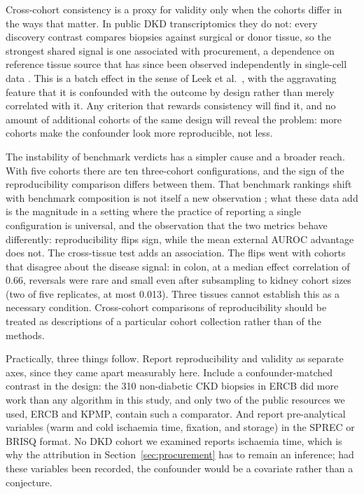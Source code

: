 \documentclass[pdflatex,sn-vancouver-num]{sn-jnl}
\theoremstyle{thmstyleone}
\theoremstyle{thmstyletwo}
\theoremstyle{thmstylethree}
\begin{document}
Cross-cohort consistency is a proxy for validity only when the cohorts differ in the ways that
matter. In public DKD transcriptomics they do not: every discovery contrast compares biopsies against
surgical or donor tissue, so the strongest shared signal is one associated with procurement, a dependence on reference tissue source that has since been observed independently in single-cell data \cite{menon2026}. This is a batch
effect in the sense of Leek et al.\ \cite{leek2010}, with the aggravating feature that it is
confounded with the outcome by design rather than merely correlated with it. Any criterion that
rewards consistency will find it, and no amount of additional cohorts of the same design will
reveal the problem: more cohorts make the confounder look more reproducible, not less.

The instability of benchmark verdicts has a simpler cause and a broader reach. With five cohorts
there are ten three-cohort configurations, and the sign of the reproducibility comparison differs
between them. That benchmark rankings shift with benchmark composition is not itself a new
observation \cite{boulesteix2013,jelizarow2010,ullmann2023,weber2019,norel2011}; what these
data add is the
magnitude in a setting where the practice of reporting a single configuration is universal, and
the observation that the two metrics behave differently: reproducibility flips sign, while the
mean external AUROC advantage does not. The cross-tissue test adds an association. The flips went
with cohorts that disagree about the disease signal: in colon, at a median effect correlation of
0.66, reversals were rare and small even after subsampling to kidney cohort sizes (two of five
replicates, at most 0.013). Three tissues cannot establish this as a necessary condition. Cross-cohort comparisons of reproducibility should be treated as descriptions of
a particular cohort collection rather than of the methods.

Practically, three things follow. Report reproducibility and validity as separate axes, since
they came apart measurably here. Include a confounder-matched contrast in the design: the 310
non-diabetic CKD biopsies in ERCB did more work than any algorithm in this study, and only two
of the public resources we used, ERCB and KPMP, contain such a comparator. And report pre-analytical variables (warm and
cold ischaemia time, fixation, and storage) in the SPREC \cite{betsou2010,lehmann2012} or
BRISQ \cite{moore2011} format. No DKD cohort we examined reports ischaemia time, which is why the
attribution in Section~\ref{sec:procurement} has to remain an inference; had these variables been
recorded, the confounder would be a covariate rather than a conjecture.
\end{document}

